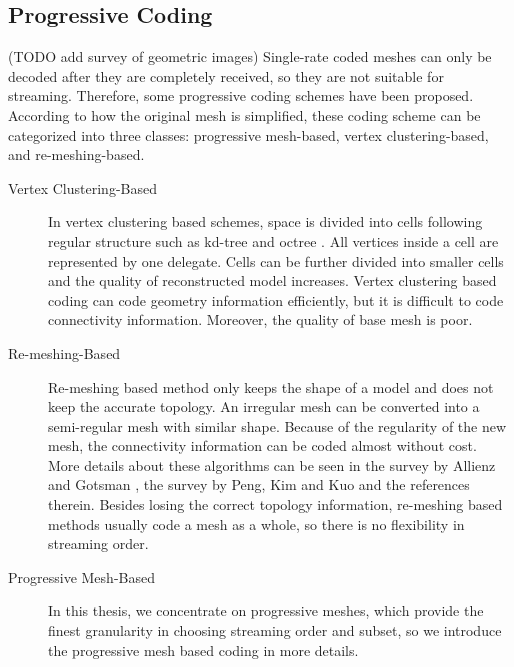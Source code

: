     \subsection{Progressive Coding}
    (TODO add survey of geometric images)
    Single-rate coded meshes can only be decoded after they are
    completely received, so they are not suitable for streaming. Therefore,
    some progressive coding schemes have been proposed. According to
    how the original mesh is simplified, these coding scheme can be
    categorized into three classes: progressive mesh-based, vertex
    clustering-based, and re-meshing-based.
    
    \begin{description}
        \item[Vertex Clustering-Based] 
            In vertex clustering based schemes, space is divided into cells
            following regular structure such as kd-tree \cite{566591} and 
            octree \cite{1073237}. All vertices inside a cell are represented
            by one delegate. Cells can be further divided into smaller cells
            and the quality of reconstructed model increases. Vertex clustering
            based coding can code geometry information efficiently, but it is 
            difficult to code connectivity information. Moreover, the quality
            of base mesh is poor.

        \item[Re-meshing-Based]
            Re-meshing based method only keeps the shape of a model
            and does not keep the accurate topology. 
            An irregular mesh can be converted into a semi-regular mesh
            with similar shape. 
            Because of the regularity of the new mesh,
            the connectivity information can be coded almost without cost.
            More details about these algorithms can be seen in the survey by Allienz and Gotsman
            \cite{recent:alliez}, the survey by Peng, Kim and Kuo
            \cite{technologies:peng} and the references therein.
            Besides losing the correct topology information,
            re-meshing based methods usually code a mesh as a whole, 
            so there is no flexibility in streaming order.

        \item[Progressive Mesh-Based]
            In this thesis, we concentrate on progressive meshes, which provide 
            the finest granularity in choosing streaming order and subset, 
            so we introduce the progressive mesh based coding in more details.
    \end{description}


